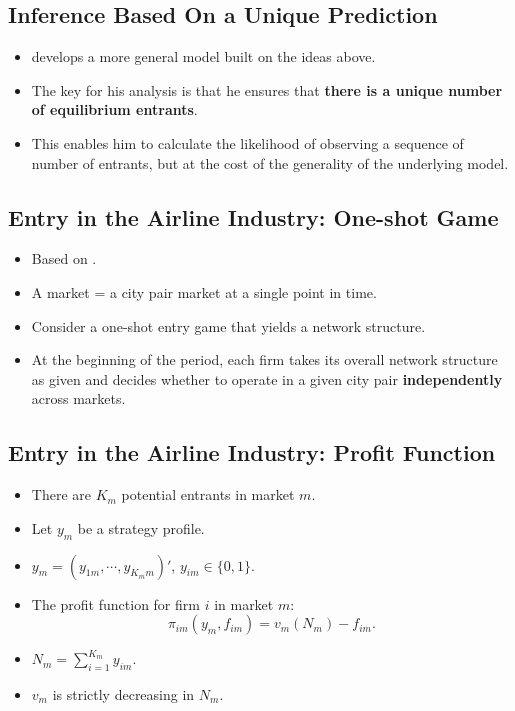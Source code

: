 \documentclass[
]{book}
\providecommand{\tightlist}{%
  \setlength{\itemsep}{0pt}\setlength{\parskip}{0pt}}
\begin{document}
\hypertarget{inference-based-on-a-unique-prediction}{%
\subsection{Inference Based On a Unique Prediction}\label{inference-based-on-a-unique-prediction}}

\begin{itemize}
\tightlist
\item
  \citet{berryEstimationModelEntry1992} develops a more general model built on the ideas above.
\item
  The key for his analysis is that he ensures that \textbf{there is a unique number of equilibrium entrants}.
\item
  This enables him to calculate the likelihood of observing a sequence of number of entrants, but at the cost of the generality of the underlying model.
\end{itemize}

\hypertarget{entry-in-the-airline-industry-one-shot-game}{%
\subsection{Entry in the Airline Industry: One-shot Game}\label{entry-in-the-airline-industry-one-shot-game}}

\begin{itemize}
\tightlist
\item
  Based on \citet{berryEstimationModelEntry1992}.
\item
  A market = a city pair market at a single point in time.
\item
  Consider a one-shot entry game that yields a network structure.
\item
  At the beginning of the period, each firm takes its overall network structure as given and decides whether to operate in a given city pair \textbf{independently} across markets.
\end{itemize}

\hypertarget{entry-in-the-airline-industry-profit-function}{%
\subsection{Entry in the Airline Industry: Profit Function}\label{entry-in-the-airline-industry-profit-function}}

\begin{itemize}
\tightlist
\item
  There are \(K_m\) potential entrants in market \(m\).
\item
  Let \(y_m\) be a strategy profile.
\item
  \(y_m = (y_{1m}, \cdots, y_{K_m m})'\), \(y_{im} \in \{0, 1\}\).
\item
  The profit function for firm \(i\) in market \(m\):
  \begin{equation}
  \pi_{im}(y_m, f_{im}) = v_m\left(N_{m}\right) - f_{im}.
  \end{equation}
\item
  \(N_{m} = \sum_{i = 1}^{K_m} y_{im}\).
\item
  \(v_m\) is strictly decreasing in \(N_m\).
\end{itemize}
\end{document}
